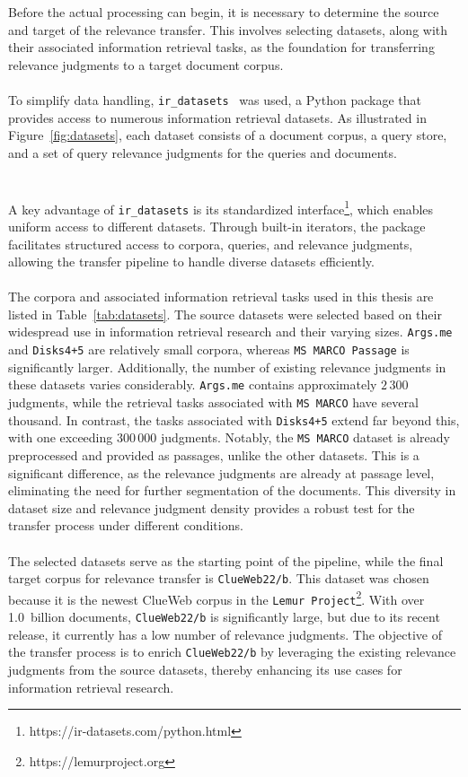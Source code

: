 Before the actual processing can begin, it is necessary to determine the source and target of the relevance transfer. This involves selecting datasets, along with their associated information retrieval tasks, as the foundation for transferring relevance judgments to a target document corpus.
\\\\
To simplify data handling, \texttt{ir\_datasets}~\cite{macavaney:2021} was used, a Python package that provides access to numerous information retrieval datasets. As illustrated in Figure~\ref{fig:datasets}, each dataset consists of a document corpus, a query store, and a set of query relevance judgments for the queries and documents.
\\\\\\
A key advantage of \texttt{ir\_datasets} is its standardized interface\footnote{\scriptsize https://ir-datasets.com/python.html}, which enables uniform access to different datasets. Through built-in iterators, the package facilitates structured access to corpora, queries, and relevance judgments, allowing the transfer pipeline to handle diverse datasets efficiently.
\\\\
The corpora and associated information retrieval tasks used in this thesis are listed in Table~\ref{tab:datasets}. The source datasets were selected based on their widespread use in information retrieval research and their varying sizes. \texttt{Args.me} and \texttt{Disks4+5} are relatively small corpora, whereas \texttt{MS MARCO Passage} is significantly larger. Additionally, the number of existing relevance judgments in these datasets varies considerably. \texttt{Args.me} contains approximately $2\,300$ judgments, while the retrieval tasks associated with \texttt{MS MARCO} have several thousand. In contrast, the tasks associated with \texttt{Disks4+5} extend far beyond this, with one exceeding $300\,000$ judgments. Notably, the \texttt{MS MARCO} dataset is already preprocessed and provided as passages, unlike the other datasets. This is a significant difference, as the relevance judgments are already at passage level, eliminating the need for further segmentation of the documents. This diversity in dataset size and relevance judgment density provides a robust test for the transfer process under different conditions.
\\\\
The selected datasets serve as the starting point of the pipeline, while the final target corpus for relevance transfer is \texttt{ClueWeb22/b}. This dataset was chosen because it is the newest ClueWeb corpus in the \texttt{Lemur Project}\footnote{\scriptsize https://lemurproject.org}. With over 1.0~billion documents, \texttt{ClueWeb22/b} is significantly large, but due to its recent release, it currently has a low number of relevance judgments. The objective of the transfer process is to enrich \texttt{ClueWeb22/b} by leveraging the existing relevance judgments from the source datasets, thereby enhancing its use cases for information retrieval research.
\pagebreak


